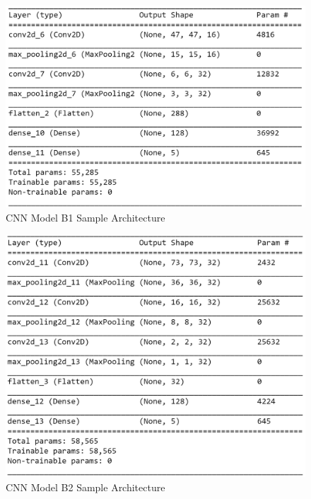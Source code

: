 \documentclass[letterpaper, 12 pt, conference]{ieeeconf}  %
\begin{document}
\begin{figure}[!h]
\centering
\includegraphics[scale=0.60]{../figs/model_arch/cnn_b1.png}	
\caption{CNN Model B1 Sample Architecture}
\label{fig:CNN_B1_Arch_Model} 
\end{figure}

\begin{figure}[!h]
\centering
\includegraphics[scale=0.60]{../figs/model_arch/cnn_b2.png}	
\caption{CNN Model B2 Sample Architecture}
\label{fig:CNN_B2_Arch_Model} 
\end{figure}
\end{document}
